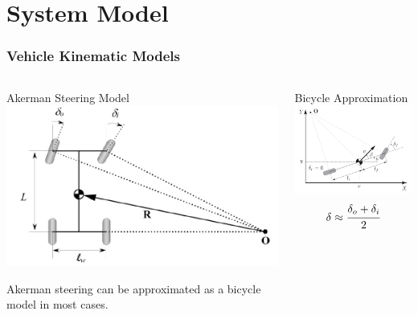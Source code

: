 \documentclass[aspectratio=169]{beamer}
\begin{document}
\section{System Model}

\begin{frame}
	\frametitle{Vehicle Kinematic Models \cite{casanova_thesis,vehcileDynamics_chapter2a}}
	\begin{columns}
		\begin{column}[t]{0.6\textwidth}
			Akerman Steering Model
			\includegraphics[width = 0.7\columnwidth]{figs/akermanModel.png}

			Akerman steering can be approximated as a bicycle model in most cases.
		\end{column}
		\begin{column}[t]{0.3\textwidth}
			Bicycle Approximation
			\includegraphics[width = \columnwidth]{figs/bikeModel.png}
			\[\delta \approx \cfrac{\delta_o + \delta_i}{2}\]
		\end{column}
	\end{columns}

\end{frame}
\end{document}

